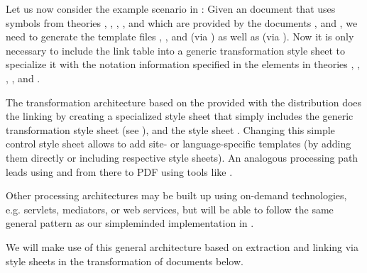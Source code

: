 \begin{omgroup}[id=transform-xsl,short=Transforming OMDoc]
Let us now consider the example scenario in {}: Given an
{\omdoc} document {} that uses symbols from theories
{}, {}, {}, {}, and {} which are
provided by the {\omdoc} documents {},
{} and {}, we need to
generate the template files {},
{}, and {} (via
{}) as well as {} (via
{}).  Now it is only necessary to include the link table
{} into a generic transformation style sheet to
specialize it with the notation information specified in the {}
elements in theories {}, {}, {}, {}, and
{}.

The transformation architecture based on the {} provided with the
{\omdoc} distribution does the linking by creating a specialized style sheet
{} that simply includes the generic {\omdoc}
transformation style sheet {} (see {}), and
the style sheet {}. Changing this simple control
style sheet allows to add site- or language-specific templates (by adding them directly or
including respective style sheets).  An analogous processing path leads
{} using {} and from there to PDF
using tools like {}.

\begin{myfig}{omdoc_presentation}{The {\omdoc} presentation Process}
  \texttt{[image: \\figuresPath\{presentation-arch]}}
\end{myfig}

Other processing architectures may be built up using
on-demand technologies, e.g. servlets, mediators, or web services, but will be
able to follow the same general pattern as our simpleminded implementation in
{}.

We will make use of this general architecture based on extraction and linking via
{\xslt} style sheets in the transformation of {\omdoc} documents below.





\end{omgroup}
